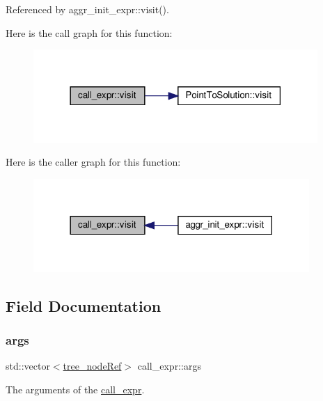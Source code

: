 Referenced by aggr\+\_\+init\+\_\+expr\+::visit().

Here is the call graph for this function\+:
\nopagebreak
\begin{figure}[H]
\begin{center}
\leavevmode
\includegraphics[width=306pt]{d2/dc9/structcall__expr_aeb0867ff82c5d47f5f86dd4e149f398f_cgraph}
\end{center}
\end{figure}
Here is the caller graph for this function\+:
\nopagebreak
\begin{figure}[H]
\begin{center}
\leavevmode
\includegraphics[width=297pt]{d2/dc9/structcall__expr_aeb0867ff82c5d47f5f86dd4e149f398f_icgraph}
\end{center}
\end{figure}


\subsection{Field Documentation}
\mbox{\label{structcall__expr_a8f0d0ecd9b91bc4d9f69cf87131dac8a}} 
\subsubsection{\texorpdfstring{args}{args}}
{\footnotesize\ttfamily std\+::vector$<$\hyperlink{tree__node_8hpp_a6ee377554d1c4871ad66a337eaa67fd5}{tree\+\_\+node\+Ref}$>$ call\+\_\+expr\+::args}



The arguments of the \hyperlink{structcall__expr}{call\+\_\+expr}. 



